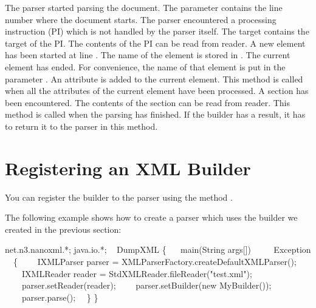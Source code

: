 \begin{callout}
  \coitem
    The \XML{} parser started parsing the document. The 
    parameter contains the line number where the document starts.
  \coitem
    The \XML{} parser encountered a processing instruction (PI) which is not
    handled by the parser itself.
    The target contains the target of the PI.
    The contents of the PI can be read from reader.
  \coitem
    A new element has been started at line .
    The name of the element is stored in .
  \coitem
    The current element has ended.
    For convenience, the name of that element is put in the parameter
    .
  \coitem
    An attribute is added to the current element.
  \coitem
    This method is called when all the attributes of the current element
    have been processed.
  \coitem
    A  section has been encountered.
    The contents of the section can be read from reader.
  \coitem
    This method is called when the parsing has finished.
    If the builder has a result, it has to return it to the parser in this
    method.
\end{callout}


\section{Registering an XML Builder}

You can register the builder to the parser using the method .

The following example shows how to create a parser which uses the builder we created in the previous section:

\begin{example}
 net.n3.nanoxml.*;
 java.io.*;
~
 DumpXML
\{
~~ main(String args[])
~~~~ Exception
~~\{
~~~~IXMLParser parser = XMLParserFactory.createDefaultXMLParser();
~~~~IXMLReader reader = StdXMLReader.fileReader("test.xml");
~~~~parser.setReader(reader);
~~~~parser.setBuilder(new MyBuilder());
~~~~parser.parse();
~~\}
\}
\end{example}
